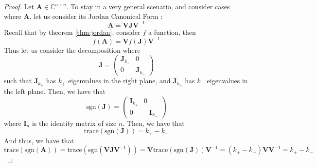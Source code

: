 \documentclass[11pt]{article}
\numberwithin{equation}{section}
\begin{document}
\begin{proof}
    Let $\mathbf{A}\in\mathbb{C}^{n\times n}$. To stay in a very general scenario, and consider cases where $\mathbf{A}$, let us consider its Jordan Canonical Form :
    \begin{equation*}
        \mathbf{A} = \mathbf{VJV}^{-1}
    \end{equation*} 
    Recall that by theorem \ref{thm:jordan}, consider $f$ a function, then 
    \begin{equation*}
        f(\mathbf{A}) = \mathbf{V}f(\mathbf{J})\mathbf{V}^{-1}
    \end{equation*}
    Thus let us consider the decomposition where 
    \begin{equation*}
        \mathbf{J} = \begin{pmatrix}
            \mathbf{J}_{k_+} & 0 \\ 0 & \mathbf{J}_{k_-}
        \end{pmatrix}
    \end{equation*}
    such that $\mathbf{J}_{k_+}$ has $k_+$ eigenvalues in the right plane, and $\mathbf{J}_{k_-}$ has $k_-$ eigenvalues in the left plane. Then, we have that
    \begin{equation*}
        \text{sgn}(\mathbf{J}) = \begin{pmatrix}
            \mathbf{I}_{k_+} & 0 \\ 0 & -\mathbf{I}_{k_-}
        \end{pmatrix}
    \end{equation*}
    where $\mathbf{I}_n$ is the identity matrix of size $n$. Then, we have that
    \begin{equation*}
        \text{trace}(\text{sgn}(\mathbf{J})) = k_+ - k_-
    \end{equation*}
    And thus, we have that
    \begin{equation*}
        \text{trace}(\text{sgn}(\mathbf{A})) = \text{trace}(\text{sgn}(\mathbf{VJV}^{-1})) = \mathbf{V}\text{trace}(\text{sgn}(\mathbf{J}))\mathbf{V}^{-1} = (k_+-k_-)\mathbf{V}\mathbf{V}^{-1} = k_+ - k_-
    \end{equation*}
\end{proof}
\printbibliography
\end{document}
